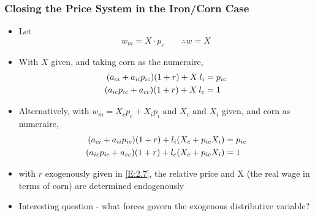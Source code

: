 \documentclass{article}
\begin{document}
\subsubsection{Closing the Price System in the Iron/Corn Case}
	\begin{itemize}
		\item  Let
		\begin{equation}
			w_m = X \cdot p_c \qquad \therefore w = X \label{E:2.6}
		\end{equation}
		\item With \( X \) given, and taking corn as the numeraire,
		\begin{align}
			(a_{ci} + a_{ii} p_{ic}) (1 + r) + X \: l_i &= p_{ic} \notag \\
			(a_{ic} p_{ic} + a_{cc}) (1 + r) + X \: l_c &= 1 \label{E:2.7}
		\end{align}
		\item Alternatively, with \( w_m = X_c p_c + X_i p_i \text{ and } X_c \text{ and } X_i\) given, and corn as numeraire,
		\begin{align}
			(a_{ci} + a_{ii} p_{ic}) (1 + r) + l_i ( X_c + p_{ic} X_i) &= p_{ic} \notag \\
			(a_{ic} p_{ic} + a_{cc}) (1 + r) + l_c ( X_c + p_{ic} X_i) &= 1 \label{E:2.8}
		\end{align}
		\item with \( r \) exogenously given in \cref{E:2.7}, the relative price and X (the real wage in terms of corn) are determined endogenously
		\item Interesting question - what forces govern the exogenous distributive variable?
	\end{itemize}
\end{document}
